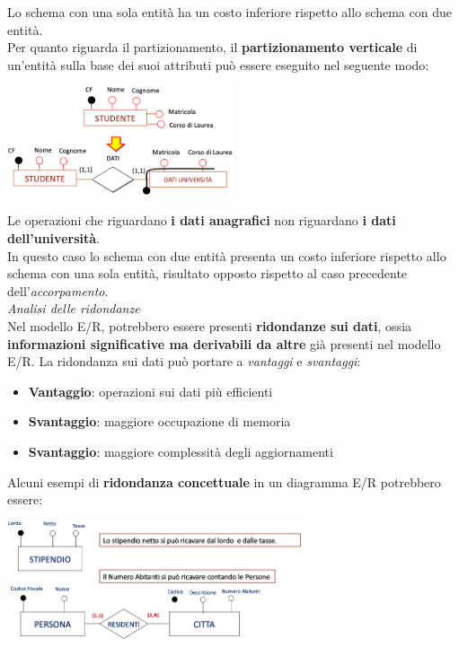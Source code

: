 \documentclass{article}
\begin{document}
Lo schema con una sola entità ha un costo inferiore rispetto allo schema con due entità.\vspace{14pt}\\
Per quanto riguarda il partizionamento, il \textbf{partizionamento verticale} di un'entità sulla base dei suoi attributi può essere eseguito nel seguente modo:
\begin{center}
    \includegraphics[width=0.5\textwidth]{foto 6.png}
\end{center}
Le operazioni che riguardano \textbf{i dati anagrafici} non riguardano \textbf{i dati dell'università}.\\
In questo caso lo schema con due entità presenta un costo inferiore rispetto allo schema con una sola entità, risultato opposto rispetto al caso precedente dell'\textit{accorpamento}.\vspace{14pt}\\
\textit{Analisi delle ridondanze}\\
Nel modello E/R, potrebbero essere presenti \textbf{ridondanze sui dati}, ossia \textbf{informazioni significative ma derivabili da altre} già presenti nel modello E/R. La ridondanza sui dati può portare a \textit{vantaggi} e \textit{svantaggi}:
\begin{itemize}[label={-}, leftmargin=1cm]
    \itemsep0em
    \item \textbf{Vantaggio}: operazioni sui dati più efficienti
    \item \textbf{Svantaggio}: maggiore occupazione di memoria
    \item \textbf{Svantaggio}: maggiore complessità degli aggiornamenti\\
\end{itemize}
Alcuni esempi di \textbf{ridondanza concettuale} in un diagramma E/R potrebbero essere:
\begin{center}
    \includegraphics[width=0.65\textwidth]{foto 7.png}
\end{center}
\end{document}
